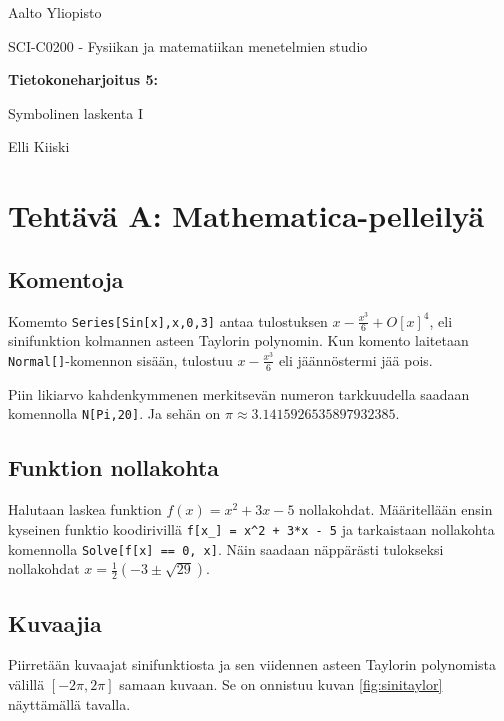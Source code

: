 \documentclass[a4paper,11pt]{article}
\begin{document}
{
\thispagestyle{empty}

{\large
Aalto Yliopisto
\par
SCI-C0200 - Fysiikan ja matematiikan menetelmien studio
}

\vspace{7cm}

{\huge \bf
Tietokoneharjoitus 5: 
\par
Symbolinen laskenta I}

\vspace{2cm}

{\Large Elli Kiiski}

\vfill

\clearpage

\tableofcontents

\clearpage

\section{Tehtävä A: Mathematica-pelleilyä}

\subsection{Komentoja}

Komemto \texttt{Series[Sin[x],{x,0,3}]} antaa tulostuksen $x-\frac{x^3}{6}+O[x]^4$, eli sinifunktion kolmannen asteen Taylorin polynomin. Kun komento laitetaan \texttt{Normal[]}-komennon sisään, tulostuu $x-\frac{x^3}{6}$ eli jäännöstermi jää pois.

Piin likiarvo kahdenkymmenen merkitsevän numeron tarkkuudella saadaan komennolla \texttt{N[Pi,20]}. Ja sehän on $\pi \approx 3.1415926535897932385$.

\subsection{Funktion nollakohta}

Halutaan laskea funktion $f(x)=x^2+3x-5$ nollakohdat. Määritellään ensin kyseinen funktio koodirivillä \texttt{f[x\_] = x\^{}2 + 3*x - 5} ja tarkaistaan nollakohta komennolla \texttt{Solve[f[x] == 0, x]}. Näin saadaan näppärästi tulokseksi nollakohdat $x=\frac{1}{2}(-3\pm\sqrt{29})$.

\subsection{Kuvaajia}

Piirretään kuvaajat sinifunktiosta ja sen viidennen asteen Taylorin polynomista välillä $[-2\pi,2\pi]$ samaan kuvaan. Se on onnistuu kuvan \ref{fig:sinitaylor} näyttämällä tavalla.

}
\end{document}
